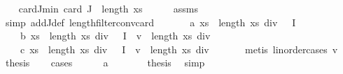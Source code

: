 \begin{isabellebody}
\isanewline
\ \ \isamarkupfalse%
\ card{\isacharunderscore}{\kern0pt}J{\isacharunderscore}{\kern0pt}min{\isacharcolon}{\kern0pt}\ {\isachardoublequoteopen}{}{\isacharasterisk}{\kern0pt}card\ J\ {\isachargreater}{\kern0pt}\ length\ xs{\isachardoublequoteclose}\isanewline
\ \ \ \ \isamarkupfalse%
\ assms{\isacharparenleft}{\kern0pt}{}{\isacharparenright}{\kern0pt}\ \isamarkupfalse%
\ {\isacharparenleft}{\kern0pt}simp\ add{\isacharcolon}{\kern0pt}J{\isacharunderscore}{\kern0pt}def\ length{\isacharunderscore}{\kern0pt}filter{\isacharunderscore}{\kern0pt}conv{\isacharunderscore}{\kern0pt}card{\isacharparenright}{\kern0pt}\isanewline
\isanewline
\ \ \isamarkupfalse%
\isanewline
\ \ \ \ {\isacharparenleft}{\kern0pt}a{\isacharparenright}{\kern0pt}\ {\isachardoublequoteopen}xs\ {\isacharbang}{\kern0pt}\ {\isacharparenleft}{\kern0pt}length\ xs\ div\ {}{\isacharparenright}{\kern0pt}\ {\isasymin}\ I{\isachardoublequoteclose}\ {\isacharbar}{\kern0pt}\isanewline
\ \ \ \ {\isacharparenleft}{\kern0pt}b{\isacharparenright}{\kern0pt}\ {\isachardoublequoteopen}xs\ {\isacharbang}{\kern0pt}\ {\isacharparenleft}{\kern0pt}length\ xs\ div\ {}{\isacharparenright}{\kern0pt}\ {\isasymnotin}\ I\ {\isasymand}\ v\ {\isachargreater}{\kern0pt}\ {\isacharparenleft}{\kern0pt}length\ xs\ div\ {}{\isacharparenright}{\kern0pt}{\isachardoublequoteclose}\ {\isacharbar}{\kern0pt}\isanewline
\ \ \ \ {\isacharparenleft}{\kern0pt}c{\isacharparenright}{\kern0pt}\ {\isachardoublequoteopen}xs\ {\isacharbang}{\kern0pt}\ {\isacharparenleft}{\kern0pt}length\ xs\ div\ {}{\isacharparenright}{\kern0pt}\ {\isasymnotin}\ I\ {\isasymand}\ v\ {\isacharless}{\kern0pt}\ {\isacharparenleft}{\kern0pt}length\ xs\ div\ {}{\isacharparenright}{\kern0pt}{\isachardoublequoteclose}\isanewline
\ \ \ \ \isamarkupfalse%
\ {\isacharparenleft}{\kern0pt}metis\ linorder{\isacharunderscore}{\kern0pt}cases\ v{\isacharunderscore}{\kern0pt}{}{\isacharparenright}{\kern0pt}\isanewline
\ \ \isamarkupfalse%
\ {\isacharquery}{\kern0pt}thesis\isanewline
\ \ \isamarkupfalse%
\ {\isacharparenleft}{\kern0pt}cases{\isacharparenright}{\kern0pt}\isanewline
\ \ \ \ \isamarkupfalse%
\ a\isanewline
\ \ \ \ \isamarkupfalse%
\ \isamarkupfalse%
\ {\isacharquery}{\kern0pt}thesis\ \isamarkupfalse%
\ simp\isanewline
\ \ \isamarkupfalse%
\isanewline
\ \ \ \ \isamarkupfalse%

\end{isabellebody}
